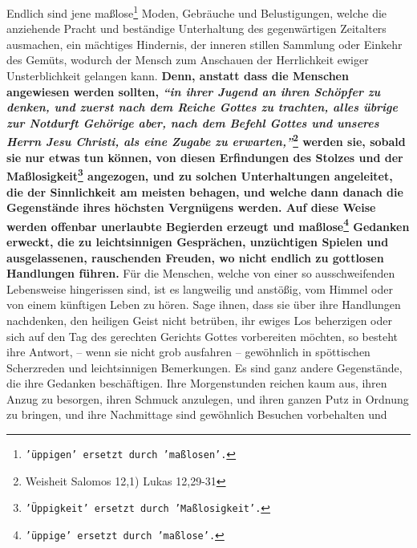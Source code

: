 Endlich sind jene
maßlose\footnote{\texttt{'üppigen' ersetzt durch 'maßlosen'.}} Moden, Gebräuche
und Belustigungen, welche die
anziehende Pracht und beständige Unterhaltung des gegenwärtigen Zeitalters
ausmachen, ein mächtiges Hindernis, der inneren stillen
Sammlung oder Einkehr des
Gemüts, wodurch der Mensch zum Anschauen der Herrlichkeit ewiger
Unsterblichkeit gelangen kann.
\label{ref:17_01_erziehung}
\textbf{Denn, anstatt dass die Menschen angewiesen werden
sollten,
\textit{"`in ihrer Jugend an ihren Schöpfer zu denken, und zuerst nach dem
Reiche Gottes zu trachten, alles übrige zur Notdurft
Gehörige aber, nach dem
Befehl Gottes und unseres Herrn Jesu Christi, als eine Zugabe zu
erwarten,"'}\footnote{Weisheit Salomos 12,1) Lukas 12,29-31}
werden sie, sobald sie nur
etwas tun können, von diesen Erfindungen des Stolzes und der
Maßlosigkeit\footnote{\texttt{'Üppigkeit' ersetzt durch 'Maßlosigkeit'.}}
angezogen, und zu solchen Unterhaltungen angeleitet, die der Sinnlichkeit am
meisten behagen, und welche dann danach die Gegenstände ihres höchsten
Vergnügens werden. Auf diese Weise werden offenbar unerlaubte Begierden erzeugt
und maßlose\footnote{\texttt{'üppige' ersetzt durch 'maßlose'.}} Gedanken
erweckt, die zu
leichtsinnigen Gesprächen, unzüchtigen
Spielen und ausgelassenen, rauschenden Freuden, wo nicht endlich zu gottlosen
Handlungen führen.} Für die Menschen, welche von einer so ausschweifenden
Lebensweise hingerissen sind, ist es langweilig und anstößig, vom Himmel oder
von einem künftigen Leben zu hören. Sage ihnen, dass sie über ihre Handlungen
nachdenken, den heiligen Geist nicht betrüben, ihr ewiges
Los beherzigen oder
sich auf den Tag des gerechten Gerichts Gottes
vorbereiten möchten, so besteht
ihre Antwort, -- wenn sie nicht grob ausfahren -- gewöhnlich in spöttischen
Scherzreden und leichtsinnigen Bemerkungen. Es sind ganz andere Gegenstände, die
ihre Gedanken beschäftigen. Ihre Morgenstunden reichen kaum aus, ihren Anzug zu
besorgen, ihren Schmuck anzulegen, und ihren ganzen Putz in Ordnung zu bringen,
und ihre Nachmittage sind gewöhnlich Besuchen vorbehalten und
\label{ref:17_01_schauspiel}
